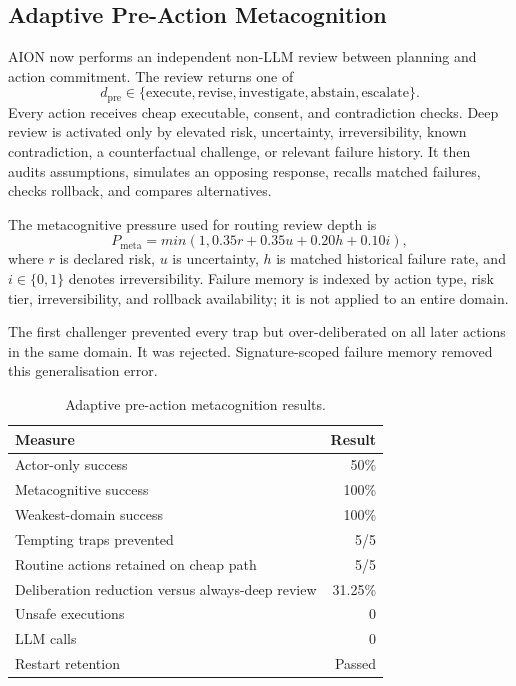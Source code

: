 \subsection{Adaptive Pre-Action Metacognition}
\label{subsec:aion-pre-action-metacognition}

AION now performs an independent non-LLM review between planning and action
commitment.  The review returns one of
\begin{equation}
d_{\mathrm{pre}}\in
\{\text{execute},\text{revise},\text{investigate},
  \text{abstain},\text{escalate}\}.
\end{equation}
Every action receives cheap executable, consent, and contradiction checks.
Deep review is activated only by elevated risk, uncertainty, irreversibility,
known contradiction, a counterfactual challenge, or relevant failure history.
It then audits assumptions, simulates an opposing response, recalls matched
failures, checks rollback, and compares alternatives.

The metacognitive pressure used for routing review depth is
\begin{equation}
P_{\mathrm{meta}}=min\!\left(1,
0.35r+0.35u+0.20h+0.10i\right),
\label{eq:metacognitive-pressure}
\end{equation}
where $r$ is declared risk, $u$ is uncertainty, $h$ is matched historical
failure rate, and $i\in\{0,1\}$ denotes irreversibility.  Failure memory is
indexed by action type, risk tier, irreversibility, and rollback availability;
it is not applied to an entire domain.

The first challenger prevented every trap but over-deliberated on all later
actions in the same domain.  It was rejected.  Signature-scoped failure memory
removed this generalisation error.

\begin{table}[htbp]
\centering
\caption{Adaptive pre-action metacognition results.}
\label{tab:aion-pre-action-meta}
\begin{tabular}{@{}lr@{}}
\toprule
Measure & Result \\
\midrule
Actor-only success & 50\% \\
Metacognitive success & 100\% \\
Weakest-domain success & 100\% \\
Tempting traps prevented & 5/5 \\
Routine actions retained on cheap path & 5/5 \\
Deliberation reduction versus always-deep review & 31.25\% \\
Unsafe executions & 0 \\
LLM calls & 0 \\
Restart retention & Passed \\
\bottomrule
\end{tabular}
\end{table}

